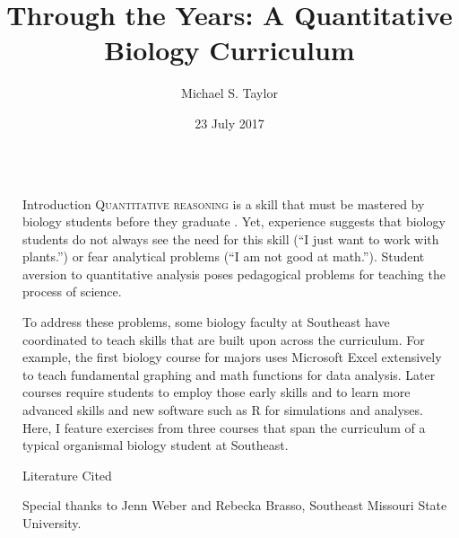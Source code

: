 \documentclass[final,hyperref={pdfpagelabels=false}]{beamer}
\title[Analysis in the Classroom]{Through the Years: A Quantitative Biology Curriculum}
\author[Taylor]{Michael S. Taylor}
\institute[SEMO]{Department of Biology}
\date{23 July 2017}
\newcommand{\whitespace}{\vspace{0.5\baselineskip}}
\newlength{\sepwid}
\newlength{\onecolwid}
\begin{document}

\begin{frame}[t]
\begin{columns}[t]
	\begin{column}{\sepwid} %
	\end{column}

	\begin{column}{\onecolwid}
    	\begin{block}{Introduction}
    		\textsc{Quantitative reasoning} is a skill that must be mastered by biology students before they graduate \citetext{; ; \citealp{hurney2011closing}}. Yet, experience suggests that biology students do not always see the need for this skill (“I just want to work with plants.”) or fear analytical problems (“I am not good at math.”). Student aversion to quantitative analysis poses pedagogical problems for teaching the process of science.
    		
    		\whitespace

			To address these problems, some biology faculty at Southeast have coordinated to teach skills that are built upon across the curriculum. For example, the first  biology course for majors uses Microsoft Excel extensively to teach fundamental graphing and math functions for data analysis. Later courses require students to employ those early skills and to learn more advanced skills and new software such as R for simulations and analyses.  \textcolor{cardiac}{Here, I feature exercises from three courses that span the curriculum of a typical organismal biology student at Southeast.}  
    	\end{block}

		\vspace*{\sepwid}

		\begin{block}{Literature Cited}
			\setlength{\bibhang}{0.5em}
			
			\raggedright
			{\small }
		\end{block}

		\vspace*{0.35\sepwid}

		Special thanks to Jenn Weber and Rebecka Brasso, Southeast Missouri State University.		


\end{column}
\end{columns}
\end{frame}
\end{document}
